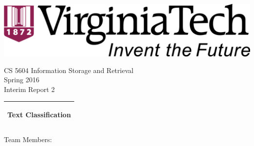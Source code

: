 %
%
%
%
%
\begin{titlepage}
  \addtolength{\hoffset}{0.5\evensidemargin-0.5\oddsidemargin} %
  \noindent%
  \begin{center}
    \includegraphics[width=0.5\textwidth-\tabcolsep]{figures/vt-logo} \\
  \end{center}
  \vspace{0.5cm}
  \begin{center}
    {\Large
      CS 5604 Information Storage and Retrieval \\
      Spring 2016\\
    }
    \vspace{0.2cm}
    {\large
      Interim Report 2%
    }
  \end{center}
  \vspace{0.2cm}
  \begin{tabular}{@{}p{\textwidth}@{}}
    \toprule[2pt]
    \midrule
    \vspace{0.2cm}
    \begin{center}
    \Huge{\textbf{
      Text Classification%
    }}
    \end{center}
    \vspace{0.2cm}\\
    \midrule
    \toprule[2pt]
  \end{tabular}
  \vspace{2 cm}
  \begin{center}
    {\Large
      Team Members:\\
}
\end{center}
\end{titlepage}

